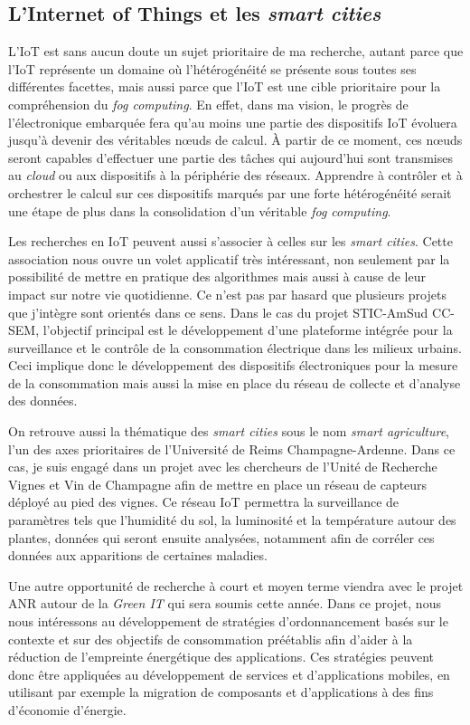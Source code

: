 \subsection*{L'Internet of Things et les \textit{smart cities}}

L'IoT est sans aucun doute un sujet prioritaire de ma recherche, autant parce que l'IoT représente un domaine où l'hétérogénéité se présente sous toutes ses différentes facettes, mais aussi parce que l'IoT est une cible prioritaire pour la compréhension du \textit{fog computing}. En effet, dans ma vision, le progrès de l'électronique embarquée fera qu'au moins une partie des dispositifs IoT évoluera jusqu'à devenir des véritables n{\oe}uds de calcul. À partir de ce moment, ces n{\oe}uds seront capables d'effectuer une partie des tâches qui aujourd'hui sont transmises au \textit{cloud} ou aux dispositifs à la périphérie des réseaux. Apprendre à contrôler et à orchestrer le calcul sur ces dispositifs marqués par une forte hétérogénéité serait une étape de plus dans la consolidation d'un véritable \textit{fog computing}.

Les recherches en IoT peuvent aussi s'associer à celles sur les \textit{smart cities}. Cette association nous ouvre un volet applicatif très intéressant, non seulement par la possibilité de mettre en pratique des algorithmes mais aussi à cause de leur impact sur notre vie quotidienne. Ce n'est pas par hasard que plusieurs projets que j'intègre sont orientés dans ce sens. Dans le cas du projet STIC-AmSud CC-SEM, l'objectif principal est le développement d’une plateforme intégrée pour la surveillance et le contrôle de la consommation électrique dans les milieux urbains. Ceci implique donc le développement des dispositifs électroniques pour la mesure de la consommation mais aussi la mise en place du réseau de collecte et d'analyse des données. 

On retrouve aussi la thématique des \textit{smart cities} sous le nom \textit{smart agriculture},  l'un des axes prioritaires de l'Université de Reims Champagne-Ardenne. Dans ce cas, je suis engagé dans un projet avec les chercheurs de l'Unité de Recherche Vignes et Vin de Champagne afin de mettre en place un réseau de capteurs déployé au pied des vignes. Ce réseau IoT permettra la surveillance de paramètres tels que l'humidité du sol, la luminosité et la température autour des plantes, données qui seront ensuite analysées, notamment afin de corréler ces données aux apparitions de certaines maladies. 

Une autre opportunité de recherche à court et moyen terme viendra avec le projet ANR autour de la \textit{Green IT} qui sera soumis cette année. Dans ce projet, nous nous intéressons au développement de stratégies d'ordonnancement basés sur le contexte et sur des objectifs de consommation préétablis afin d'aider à la réduction de l'empreinte énergétique des applications. Ces stratégies peuvent donc être appliquées au développement de services et d'applications mobiles, en utilisant par exemple la migration de composants et d'applications à des fins d'économie d'énergie. 

